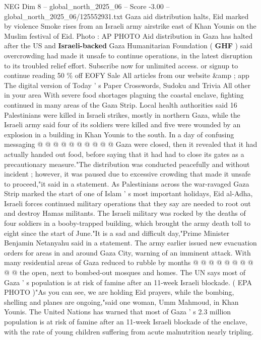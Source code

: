 \begin{textsample}{NEG Dim 8 – global\_north\_2025\_06 – Score -3.00 – global\_north\_2025\_06/125552931.txt}  \label{ex:f8_neg_022}
Gaza aid distribution halts, Eid marked by violence Smoke rises from an Israeli army airstrike east of Khan Younis on the Muslim festival of Eid.
Photo : AP PHOTO Aid distribution in Gaza has halted after the US and \textbf{Israeli-backed} Gaza Humanitarian Foundation ( \textbf{GHF} ) said overcrowding had made it unsafe to continue operations, in the latest disruption to its troubled relief effort.
Subscribe now for unlimited access. or signup to continue reading 50 \% off EOFY Sale All articles from our website \&amp ; app The digital version of Today ' s Paper Crosswords, Sudoku and Trivia All other in your area With severe food shortages plaguing the coastal enclave, fighting continued in many areas of the Gaza Strip.
Local health authorities said 16 Palestinians were killed in Israeli strikes, mostly in northern Gaza, while the Israeli army said four of its soldiers were killed and five were wounded by an explosion in a building in Khan Younis to the south.
In a day of confusing messaging @ @ @ @ @ @ @ @ @ @ Gaza were closed, then it revealed that it had actually handed out food, before saying that it had had to close its gates as a precautionary measure."The distribution was conducted peacefully and without incident ; however, it was paused due to excessive crowding that made it unsafe to proceed,"it said in a statement.
As Palestinians across the war-ravaged Gaza Strip marked the start of one of Islam ' s most important holidays, Eid al-Adha, Israeli forces continued military operations that they say are needed to root out and destroy Hamas militants.
The Israeli military was rocked by the deaths of four soldiers in a booby-trapped building, which brought the army death toll to eight since the start of June."It is a sad and difficult day,"Prime Minister Benjamin Netanyahu said in a statement.
The army earlier issued new evacuation orders for areas in and around Gaza City, warning of an imminent attack.
With many residential areas of Gaza reduced to rubble by months @ @ @ @ @ @ @ @ @ @ the open, next to bombed-out mosques and homes.
The UN says most of Gaza ' s population is at risk of famine after an 11-week Israeli blockade. ( EPA PHOTO )"As you can see, we are holding Eid prayers, while the bombing, shelling and planes are ongoing,"said one woman, Umm Mahmoud, in Khan Younis.
The United Nations has warned that most of Gaza ' s 2.3 million population is at risk of famine after an 11-week Israeli blockade of the enclave, with the rate of young children suffering from acute malnutrition nearly tripling.

\end{textsample}
